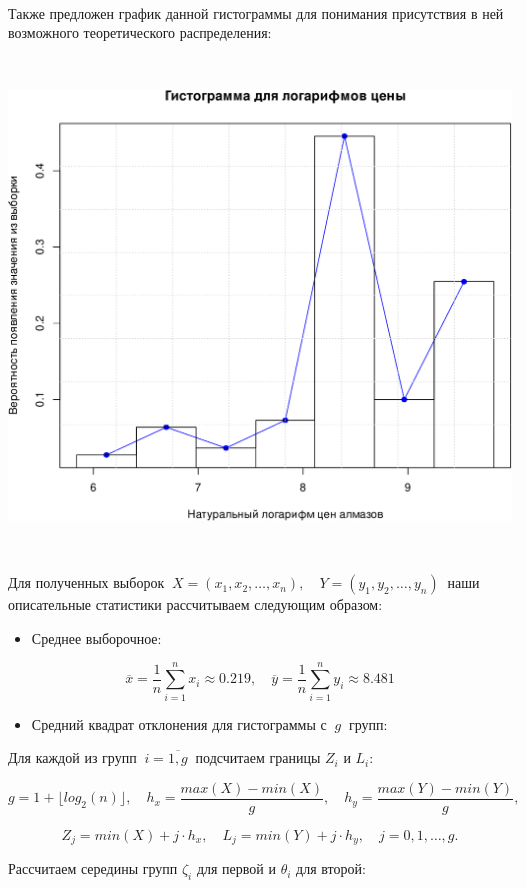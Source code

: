 \documentclass[
]{article}
\providecommand{\tightlist}{%
  \setlength{\itemsep}{0pt}\setlength{\parskip}{0pt}}
\begin{document}
\(\ \)

Также предложен график данной гистограммы для понимания присутствия в
ней возможного теоретического распределения:

\(\ \)

\begin{center}\includegraphics[width=0.6\linewidth]{Prac5_files/figure-latex/unnamed-chunk-8-1} \end{center}

\(\ \)

Для полученных выборок
\(\ X = (x_1, x_2, \dots, x_n), \quad Y = (y_1, y_2, \dots, y_n)\ \)
наши описательные статистики рассчитываем следующим образом:

\begin{itemize}
\tightlist
\item
  Среднее выборочное:
\end{itemize}

\[
\overline{x} = \frac{1}{n} \sum \limits_{i=1}^{n} x_i \approx 0.219, \quad \overline{y} = \frac{1}{n} \sum \limits_{i=1}^{n} y_i \approx 8.481
\]

\begin{itemize}
\tightlist
\item
  Средний квадрат отклонения для гистограммы с \(\ g\ \) групп:
\end{itemize}

Для каждой из групп \(\ i = \overline{1, g}\ \) подсчитаем границы
\(Z_i\) и \(L_i\):

\[
g = 1 + \lfloor log_2(n)\rfloor, \quad  h_x = \frac{max(X) - min(X)}{g}, \quad h_y = \frac{max(Y) - min(Y)}{g},
\]

\[
Z_j = min(X) + j \cdot h_x,\quad L_j = min(Y) + j \cdot h_y, \quad  j=0, 1, \dots, g.
\]

Рассчитаем середины групп \(\zeta_i\) для первой и \(\theta_i\) для
второй:
\end{document}
